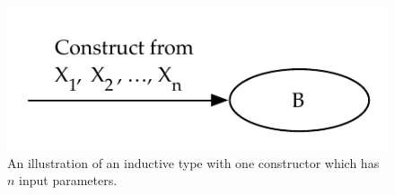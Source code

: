 \begin{figure}[h]
  \centering
  \includegraphics{figures/general_coind_intuition_prod_inductive}
  
  \caption{An illustration of an inductive type with one constructor which has
    $n$ input parameters.}
\label{fig:inductive_type_one_constructor}
\end{figure}








